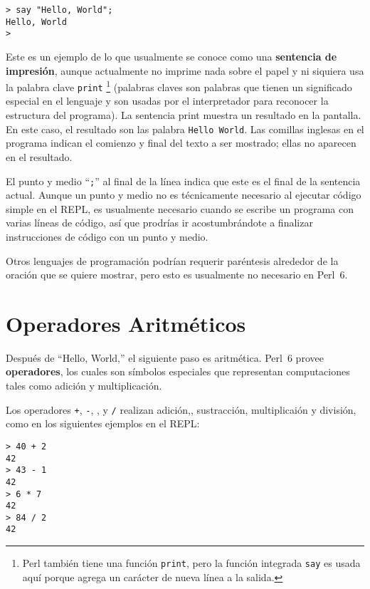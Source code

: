 \begin{verbatim}
> say "Hello, World";
Hello, World
>
\end{verbatim}
%
Este es un ejemplo de lo que usualmente se conoce como una {\bf sentencia de impresión},
aunque actualmente no imprime nada sobre el papel y ni siquiera usa la palabra clave
{\tt print} 
\footnote{Perl también tiene una función {\tt print},
pero la función integrada {\tt say} es usada aquí 
porque agrega un carácter de nueva línea a la salida.}
(palabras claves son palabras que tienen un significado especial
en el lenguaje y son usadas por el interpretador para reconocer la
estructura del programa).
La sentencia print muestra un resultado en la pantalla. En este caso, 
el resultado son las palabra {\tt Hello World}.
%
Las comillas inglesas en el programa indican el comienzo y final
del texto a ser mostrado; ellas no aparecen en el resultado.

El punto y medio ``{\tt ;}'' al final de la línea indica
que este es el final de la sentencia actual. Aunque un punto y medio
no es técnicamente necesario al ejecutar código simple en el REPL, 
es usualmente necesario cuando se escribe un programa con varias líneas
de código, así que prodrías ir acostumbrándote a finalizar instrucciones
de código con un punto y medio.   

Otros lenguajes de programación podrían requerir paréntesis
alrededor de la oración que se quiere mostrar, pero esto es usualmente 
no necesario en Perl~6.

\section{Operadores Aritméticos}

Después de ``Hello, World,'' el siguiente paso es aritmética. Perl~6 provee {\bf operadores}, los cuales son símbolos especiales que representan computaciones tales como adición y multiplicación.

Los operadores {\tt +}, {\tt -}, {\tt *}, y {\tt /} realizan adición,, sustracción, multiplicaión y división, como en los siguientes ejemplos en el REPL:

\begin{verbatim}
> 40 + 2
42
> 43 - 1
42
> 6 * 7
42
> 84 / 2
42
\end{verbatim}
%

